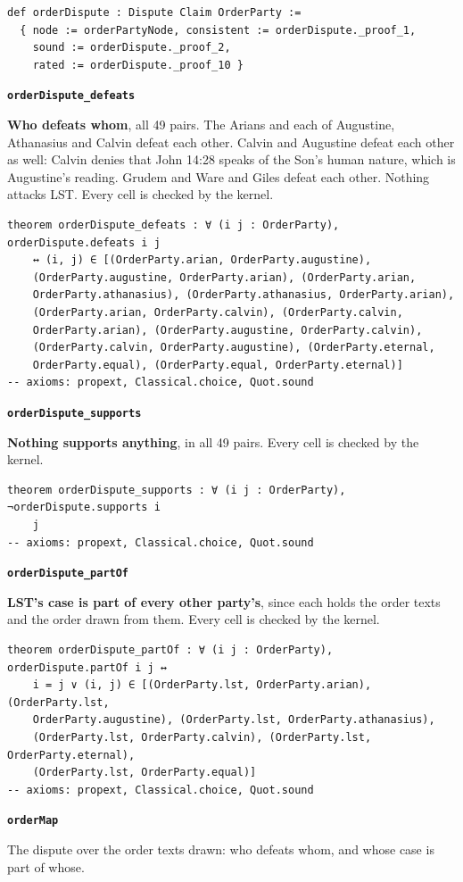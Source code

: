\documentclass[11pt,paper=\testimonypaper,DIV=13,parskip=false]{scrartcl}
\begin{document}
{\small\begin{verbatim}
def orderDispute : Dispute Claim OrderParty :=
  { node := orderPartyNode, consistent := orderDispute._proof_1,
    sound := orderDispute._proof_2,
    rated := orderDispute._proof_10 }
\end{verbatim}}
\par\medskip\noindent\textbf{\texttt{order\allowbreak{}Dispute\_\allowbreak{}defeats}}\par\nobreak\noindent
\textbf{Who defeats whom}, all 49 pairs. The Arians and each of Augustine, Athanasius and Calvin defeat each other. Calvin and Augustine defeat each other as well: Calvin denies that John 14:28 speaks of the Son’s human nature, which is Augustine’s reading. Grudem and Ware and Giles defeat each other. Nothing attacks LST. Every cell is checked by the kernel.

{\small\begin{verbatim}
theorem orderDispute_defeats : ∀ (i j : OrderParty), orderDispute.defeats i j
    ↔ (i, j) ∈ [(OrderParty.arian, OrderParty.augustine),
    (OrderParty.augustine, OrderParty.arian), (OrderParty.arian,
    OrderParty.athanasius), (OrderParty.athanasius, OrderParty.arian),
    (OrderParty.arian, OrderParty.calvin), (OrderParty.calvin,
    OrderParty.arian), (OrderParty.augustine, OrderParty.calvin),
    (OrderParty.calvin, OrderParty.augustine), (OrderParty.eternal,
    OrderParty.equal), (OrderParty.equal, OrderParty.eternal)]
-- axioms: propext, Classical.choice, Quot.sound
\end{verbatim}}
\par\medskip\noindent\textbf{\texttt{order\allowbreak{}Dispute\_\allowbreak{}supports}}\par\nobreak\noindent
\textbf{Nothing supports anything}, in all 49 pairs. Every cell is checked by the kernel.

{\small\begin{verbatim}
theorem orderDispute_supports : ∀ (i j : OrderParty), ¬orderDispute.supports i
    j
-- axioms: propext, Classical.choice, Quot.sound
\end{verbatim}}
\par\medskip\noindent\textbf{\texttt{order\allowbreak{}Dispute\_\allowbreak{}part\allowbreak{}Of}}\par\nobreak\noindent
\textbf{LST’s case is part of every other party’s}, since each holds the order texts and the order drawn from them. Every cell is checked by the kernel.

{\small\begin{verbatim}
theorem orderDispute_partOf : ∀ (i j : OrderParty), orderDispute.partOf i j ↔
    i = j ∨ (i, j) ∈ [(OrderParty.lst, OrderParty.arian), (OrderParty.lst,
    OrderParty.augustine), (OrderParty.lst, OrderParty.athanasius),
    (OrderParty.lst, OrderParty.calvin), (OrderParty.lst, OrderParty.eternal),
    (OrderParty.lst, OrderParty.equal)]
-- axioms: propext, Classical.choice, Quot.sound
\end{verbatim}}
\par\medskip\noindent\textbf{\texttt{order\allowbreak{}Map}}\par\nobreak\noindent
The dispute over the order texts drawn: who defeats whom, and whose case is part of whose.
\end{document}
